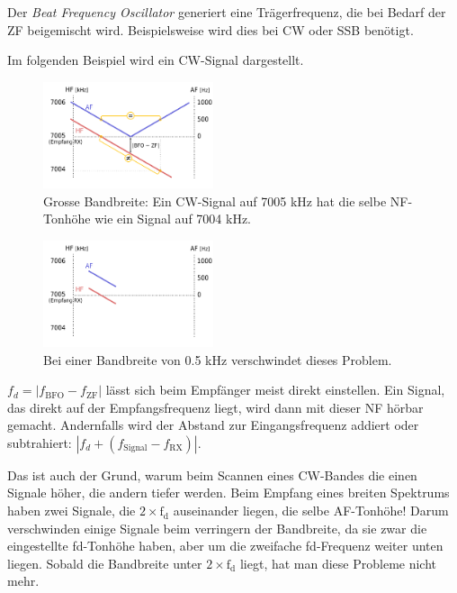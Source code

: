 {Der \textit{Beat Frequency Oscillator} generiert eine Trägerfrequenz, die bei Bedarf der ZF beigemischt wird. Beispielsweise wird dies bei CW oder SSB benötigt.

Im folgenden Beispiel wird ein CW-Signal dargestellt. 

\begin{figure}[h!]
 \centering
 \includegraphics[width=5cm]{./png/Amfu-BFO.png}
 \caption{Grosse Bandbreite: Ein CW-Signal auf 7005 kHz hat die selbe NF-Tonhöhe wie ein Signal auf 7004 kHz.}
 \label{fig:bfo}
\end{figure}
\begin{figure}[h!]
 \centering
 \includegraphics[width=5cm]{./png/Amfu-BFO-Filter.png}
 \caption{Bei einer Bandbreite von 0.5 kHz verschwindet dieses Problem.}
 \label{fig:bfoFilter}
\end{figure}



$f_d = |f_{\mathrm{BFO}}-f_{\mathrm{ZF}}|$ lässt sich beim Empfänger meist direkt einstellen. Ein Signal, das direkt auf der Empfangsfrequenz liegt, wird dann mit dieser NF hörbar gemacht. Andernfalls wird der Abstand zur Eingangsfrequenz addiert oder subtrahiert: $|f_d + (f_\mathrm{Signal}-f_\mathrm{RX})|$.

Das ist auch der Grund, warum beim Scannen eines CW-Bandes die einen Signale höher, die andern tiefer werden. Beim Empfang eines breiten Spektrums haben zwei Signale, die $2\times \mathrm{f_d}$ auseinander liegen, die selbe AF-Tonhöhe! Darum verschwinden einige Signale beim verringern der Bandbreite, da sie zwar die eingestellte fd-Tonhöhe haben, aber um die zweifache fd-Frequenz weiter unten liegen. Sobald die Bandbreite unter $2\times \mathrm{f_d}$  liegt, hat man diese Probleme nicht mehr.}


